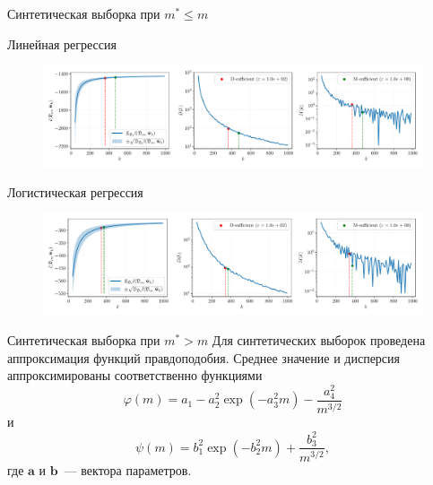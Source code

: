\documentclass{beamer}
\begin{document}
\begin{frame}{Синтетическая выборка при $m^* \leqslant m$}
    \begin{center}
        Линейная регрессия
    \end{center}
    \begin{figure}[h!]
        \centering
        \includegraphics[width=\textwidth]{paper/figures/synthetic-regression-sufficient.pdf}
        \label{synthetic-regression-sufficient}
    \end{figure}
    \vspace{-1cm}
    \begin{center}
        Логистическая регрессия
    \end{center}
    \begin{figure}[h!]
        \centering
        \includegraphics[width=\textwidth]{paper/figures/synthetic-classification-sufficient.pdf}
        \label{synthetic-classification-sufficient}
    \end{figure}
\end{frame}
\begin{frame}{Синтетическая выборка при $m^* > m$}
    Для синтетических выборок проведена аппроксимация функций правдоподобия. Среднее значение и дисперсия аппроксимированы соответственно функциями
    \[ \varphi(m) = a_1 - a_2^2 \exp\left( - a_3^2 m \right) - \dfrac{a_4^2}{m^{3/2}} \]
    и
    \[ \psi(m) = b_1^2 \exp\left( - b_2^2 m \right) + \dfrac{b_3^2}{m^{3/2}}, \]
    где $\mathbf{a}$ и $\mathbf{b}$~--- вектора параметров.
\end{frame}
\end{document}
